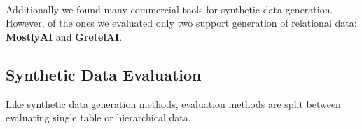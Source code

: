 \documentclass[fleqn,moreauthors,10pt]{ds_report}
\begin{document}
\\

Additionally we found many commercial tools for synthetic data generation. However, of the ones we evaluated only two support generation of relational data: \textbf{MostlyAI} and \textbf{GretelAI}.

\subsection*{Synthetic Data Evaluation}
Like synthetic data generation methods, evaluation methods are split between evaluating single table or hierarchical data.
\end{document}
